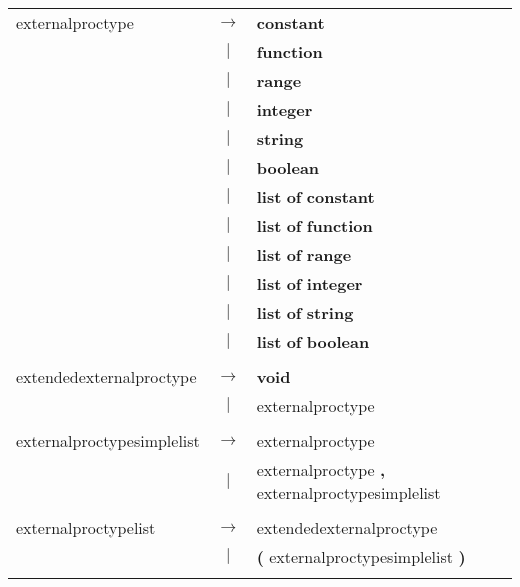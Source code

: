 \begin{tabular}{lcl}
externalproctype & $\rightarrow$ & \textbf{constant} \\
 & $|$ & \textbf{function} \\
 & $|$ & \textbf{range} \\
 & $|$ & \textbf{integer} \\
 & $|$ & \textbf{string} \\
 & $|$ & \textbf{boolean} \\
 & $|$ & \textbf{list} \textbf{of} \textbf{constant} \\
 & $|$ & \textbf{list} \textbf{of} \textbf{function} \\
 & $|$ & \textbf{list} \textbf{of} \textbf{range} \\
 & $|$ & \textbf{list} \textbf{of} \textbf{integer} \\
 & $|$ & \textbf{list} \textbf{of} \textbf{string} \\
 & $|$ & \textbf{list} \textbf{of} \textbf{boolean} \\
 & & \\
extendedexternalproctype & $\rightarrow$ & \textbf{void} \\
 & $|$ & externalproctype \\
 & & \\
externalproctypesimplelist & $\rightarrow$ & externalproctype \\
 & $|$ & externalproctype \textbf{,} externalproctypesimplelist \\
 & & \\
externalproctypelist & $\rightarrow$ & extendedexternalproctype \\
 & $|$ & \textbf{(} externalproctypesimplelist \textbf{)} \\
 & & \\
\end{tabular}

